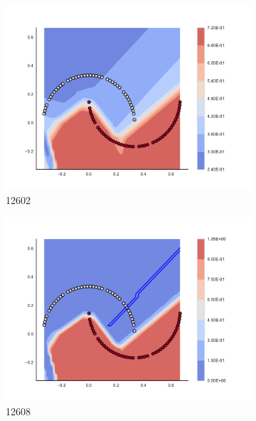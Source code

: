 \begin{figure}[h]
\begin{subfigure}[b]{0.09\textwidth}
    \includegraphics[clip, trim=2.35cm 1.75cm 4.5cm 0cm,width=\textwidth]{img/convergence/12602.pdf}
    \caption{12602}
    \label{fig:convergence_12602}
\end{subfigure}
%
\begin{subfigure}[b]{0.09\textwidth}
    \includegraphics[clip, trim=2.35cm 1.75cm 4.5cm 0cm,width=\textwidth]{img/convergence/12608.pdf}
    \caption{12608}
    \label{fig:convergence_12608}
\end{subfigure}
%
\begin{subfigure}[b]{0.09\textwidth}

\end{subfigure}
\end{figure}
